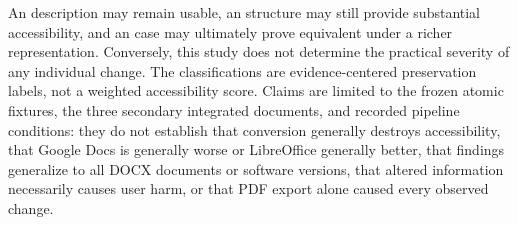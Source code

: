 An \altered{} description may remain usable, an \observedpartial{} structure may still provide substantial accessibility, and an \unresolved{} case may ultimately prove equivalent under a richer representation. Conversely, this study does not determine the practical severity of any individual change. The classifications are evidence-centered preservation labels, not a weighted accessibility score. Claims are limited to the frozen atomic fixtures, the three secondary integrated documents, and recorded pipeline conditions: they do not establish that conversion generally destroys accessibility, that Google Docs is generally worse or LibreOffice generally better, that findings generalize to all DOCX documents or software versions, that altered information necessarily causes user harm, or that PDF export alone caused every observed change.


